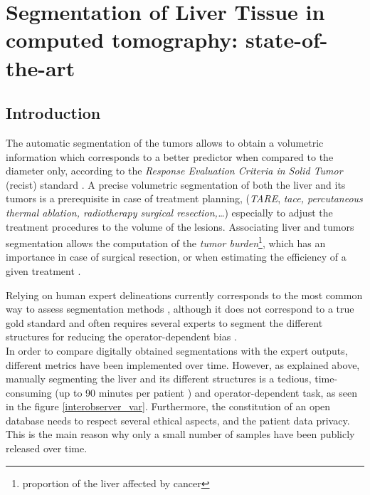 

\chapter{Segmentation of Liver Tissue in computed tomography: state-of-the-art} \label{SegSemantic}

\section{Introduction}


The automatic segmentation of the tumors allows to obtain a volumetric information which corresponds to a better predictor when
compared to the diameter only, according to the \emph{Response
	Evaluation Criteria in Solid Tumor} (\ac{recist}) standard \cite{Eisenhauer2008, Ye2017}. A precise
volumetric segmentation of both the liver and its tumors is a
prerequisite in case of treatment planning, (\emph{TARE}, \emph{\ac{tace},
	percutaneous thermal ablation, radiotherapy surgical resection,\ldots{}}) especially to adjust the treatment procedures to the volume of the lesions\cite{Al-Nahhas2014, Yamada1983, Albain2009, Rossi96}. Associating liver and tumors
segmentation allows the computation of the \emph{tumor burden}\footnote{proportion of the liver affected by cancer}, which
has an importance in case of surgical resection, or when estimating the
efficiency of a given treatment \cite{Nordlinger1996, Jagannath1986, Gobbi2004, Bauknecht2010, Bornemann2007, Heussel2007, Kuhnigk2006, Puesken2010}.

Relying on human expert
delineations currently corresponds to the most common way to assess
segmentation methods \cite{Bilic2019}, although it does not correspond 
to a true gold standard \cite{Heimann2009} and often requires several experts to segment the
different structures for reducing the operator-dependent bias \cite{Echegaray2015, Moltz2009}.\\
In order to compare digitally obtained segmentations with the expert
outputs, different metrics have been implemented over time. However, as
explained above, manually segmenting the liver and its different
structures is a tedious, time-consuming (up to 90 minutes per patient
\cite{Gotra2017}) and operator-dependent task, as seen in the figure \ref{interobserver_var}.
Furthermore, the constitution of an open database needs to respect
several ethical aspects, and the patient data privacy. This is the main
reason why only a small number of samples have been publicly released
over time.

